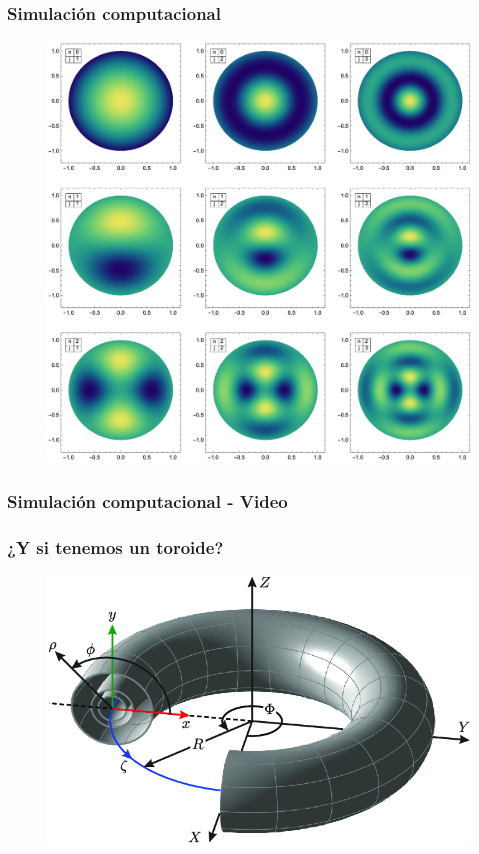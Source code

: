 \documentclass[12pt]{beamer}
\begin{document}
\begin{frame}
\frametitle{Simulación computacional}
\begin{figure}[h!]
    \centering
    \includegraphics[scale=0.32]{Imagenes/Modos_Vibracion_Membrana_Circular_01.eps}
\end{figure}
\end{frame}
\begin{frame}
\frametitle{Simulación computacional - Video}
\end{frame}
\begin{frame}
\frametitle{¿Y si tenemos un toroide?}
\begin{figure}
    \centering
    \includegraphics[scale=0.4]{Imagenes/Geometria_Toro.png}
\end{figure}
\end{frame}
\end{document}
